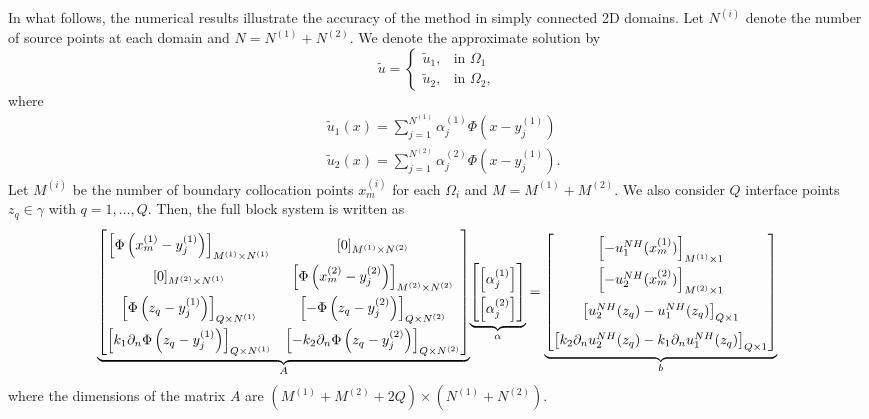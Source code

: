 In what follows, the numerical results illustrate the accuracy of the method in simply connected 2D domains. Let \(N^{(i)}\) denote the number of source points at each domain and \(N=N^{(1)}+N^{(2)}\). We denote the approximate solution by
\[
    \tilde{u} = \begin{cases}
        \tilde{u}_1, & \text{in } \Omega_1\\
        \tilde{u}_2, & \text{in } \Omega_2,
    \end{cases}
\]
where
\begin{align*}
    &\tilde{u}_1(x) = \sum_{j=1}^{N^{(1)}} \alpha^{(1)}_j \Phi\left(x-y_j^{(1)}\right)\\
    &\tilde{u}_2(x) = \sum_{j=1}^{N^{(2)}} \alpha^{(2)}_j \Phi\left(x-y_j^{(1)}\right).
\end{align*}
Let \(M^{(i)}\) be the number of boundary collocation points \(x^{(i)}_{m}\) for each \(\Omega_i\) and \(M=M^{(1)}+M^{(2)}\). We also consider \(Q\) interface points \(z_q \in \gamma\) with \(q=1,\dots,Q\). Then, the full block system is written as
\begin{equation}\label{MFS_transmission_classical_matrices_system}
    \renewcommand{\arraystretch}{1.75} %
    {\underbrace{\begin{bmatrix}
        \left[\Phi\left(x^{(1)}_{m}-y_j^{(1)}\right)\right]_{M^{(1)}\times N^{(1)}} & [0]_{M^{(1)}\times N^{(2)}} \\
        [0]_{M^{(2)}\times N^{(1)}} & \left[\Phi\left(x^{(2)}_{m}-y_j^{(2)}\right)\right]_{M^{(2)}\times N^{(2)}} \\
        \left[\Phi\left(z_q-y_j^{(1)}\right)\right]_{Q\times N^{(1)}} & \left[-\Phi\left(z_q-y_j^{(2)}\right)\right]_{Q\times N^{(2)}} \\
        \left[k_1\partial_n \Phi\left(z_q-y_j^{(1)}\right)\right]_{Q\times N^{(1)}} & \left[-k_2 \partial_n \Phi\left(z_q-y_j^{(2)}\right)\right]_{Q\times N^{(2)}}
    \end{bmatrix}}_A}
    {\underbrace{\begin{bmatrix}
        \left[\alpha^{(1)}_j\right]\\
        \left[\alpha^{(2)}_j\right]
    \end{bmatrix}}_\alpha}=
    {\underbrace{\begin{bmatrix}
        \left[-u_1^{NH}(x^{(1)}_{m})\right]_{M^{(1)}\times 1}\\
        \left[-u_2^{NH}(x^{(2)}_{m})\right]_{M^{(2)}\times 1}\\
        \left[u_2^{NH}(z_q)-u_1^{NH}(z_q)\right]_{Q\times 1}\\
        \left[k_2 \partial_n u_2^{NH}(z_q)- k_1 \partial_n u_1^{NH}(z_q)\right]_{Q\times 1}\\
    \end{bmatrix}}_b}
\end{equation}
where the dimensions of the matrix \(A\) are \((M^{(1)}+M^{(2)}+2Q)\times(N^{(1)}+N^{(2)})\).

